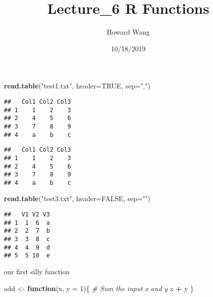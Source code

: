 \documentclass[]{article}
\title{Lecture\_6 R Functions}
\author{Howard Wang}
\date{10/18/2019}
\newenvironment{Shaded}{\begin{snugshade}}{\end{snugshade}}
\newcommand{\CommentTok}[1]{\textcolor[rgb]{0.56,0.35,0.01}{\textit{#1}}}
\newcommand{\ControlFlowTok}[1]{\textcolor[rgb]{0.13,0.29,0.53}{\textbf{#1}}}
\newcommand{\DataTypeTok}[1]{\textcolor[rgb]{0.13,0.29,0.53}{#1}}
\newcommand{\DecValTok}[1]{\textcolor[rgb]{0.00,0.00,0.81}{#1}}
\newcommand{\KeywordTok}[1]{\textcolor[rgb]{0.13,0.29,0.53}{\textbf{#1}}}
\newcommand{\NormalTok}[1]{#1}
\newcommand{\OperatorTok}[1]{\textcolor[rgb]{0.81,0.36,0.00}{\textbf{#1}}}
\newcommand{\OtherTok}[1]{\textcolor[rgb]{0.56,0.35,0.01}{#1}}
\newcommand{\StringTok}[1]{\textcolor[rgb]{0.31,0.60,0.02}{#1}}
\begin{document}
\maketitle

\begin{Shaded}
\begin{Highlighting}[]
\KeywordTok{read.table}\NormalTok{(}\StringTok{"test1.txt"}\NormalTok{, }\DataTypeTok{header=}\OtherTok{TRUE}\NormalTok{, }\DataTypeTok{sep=}\StringTok{","}\NormalTok{)}
\end{Highlighting}
\end{Shaded}

\begin{verbatim}
##   Col1 Col2 Col3
## 1    1    2    3
## 2    4    5    6
## 3    7    8    9
## 4    a    b    c
\end{verbatim}

\begin{Shaded}
\end{Shaded}

\begin{verbatim}
##   Col1 Col2 Col3
## 1    1    2    3
## 2    4    5    6
## 3    7    8    9
## 4    a    b    c
\end{verbatim}

\begin{Shaded}
\begin{Highlighting}[]
\KeywordTok{read.table}\NormalTok{(}\StringTok{"test3.txt"}\NormalTok{, }\DataTypeTok{header=}\OtherTok{FALSE}\NormalTok{, }\DataTypeTok{sep=}\StringTok{""}\NormalTok{)}
\end{Highlighting}
\end{Shaded}

\begin{verbatim}
##   V1 V2 V3
## 1  1  6  a
## 2  2  7  b
## 3  3  8  c
## 4  4  9  d
## 5  5 10  e
\end{verbatim}

our first silly function

\begin{Shaded}
\begin{Highlighting}[]
\NormalTok{add <-}\StringTok{ }\ControlFlowTok{function}\NormalTok{(x, }\DataTypeTok{y =} \DecValTok{1}\NormalTok{)\{}
  \CommentTok{# Sum the input x and y}
\NormalTok{  x }\OperatorTok{+}\StringTok{ }\NormalTok{y}
\NormalTok{\}}
\end{Highlighting}
\end{Shaded}
\end{document}
